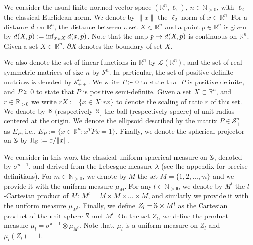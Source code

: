 We consider the usual finite normed vector space $(\mathbb{R}^n,\ell_2)$, $n \in \mathbb{N}_{> 0}$, with $\ell_2$ the classical Euclidean norm. We denote by $\lVert x \rVert$ the $\ell_2$-norm of $x \in \mathbb{R}^n$. For a distance $d$ on $\mathbb{R}^n$, the distance between a set $X \subset \mathbb{R}^n$ and a point $p \in \mathbb{R}^n$ is given by $d(X, p):=\inf_{x \in X}d(x,p)$. Note that the map $p \mapsto d(X,p)$ is continuous on $\mathbb{R}^n$. Given a set $X \subset \mathbb{R}^n$, $\partial X$ denotes the boundary of set $X$.
 
We also denote the set of linear functions in $\mathbb{R}^n$ by $\mathcal{L}(\mathbb{R}^n)$, and the set of real symmetric matrices of size $n$ by $\mathcal{S}^n$. In particular, the set of positive definite matrices is denoted by $\mathcal{S}^n_{++}$. We write $P \succ 0$ to state that $P$ is positive definite, and $P \succeq 0$ to state that $P$ is positive semi-definite. Given a set $X \subset \mathbb{R}^n$, and $r \in \mathbb{R}_{> 0}$ we write \mbox{$rX := \{x \in X : rx\}$} to denote the scaling of ratio $r$ of this set. We denote by $\mathbb{B}$ (respectively $\mathbb{S}$) the ball (respectively sphere) of unit radius centered at the origin.  We denote the ellipsoid described by the matrix $P \in \mathcal{S}^n_{++}$ as $E_P$, i.e., $E_P:= \{x \in \mathbb{R}^n: x^T P x = 1\}$. Finally, we denote the spherical projector on $\mathbb{S}$ by $\Pi_{\mathbb{S}} := x/\Vert x\Vert$. 


We consider in this work the classical uniform spherical measure on $\mathbb{S}$, denoted by $\sigma^{n-1}$, and derived from the Lebesgue measure $\lambda$ (see the appendix for precise definitions). For $m \in \mathbb{N}_{>0}$, we denote by $M$ the set $M=\{1,2, \dots,m \}$ and we provide it with the uniform measure $\mu_M$. For any $l \in \mathbb{N}_{>0}$, we denote by $M^l$ the $l$-Cartesian product of $M$: $M^l = M \times M \times \dots \times M$, and similarly we provide it with the uniform measure $\mu_{M^l}$. Finally, we define $Z_l = \mathbb{S} \times M^l$ as the Cartesian product of the unit sphere $\mathbb{S}$ and $M^l$. On the set $Z_l$, we define the product measure $\mu_l = \sigma^{n-1} \otimes \mu_{M^l}$. Note that, $\mu_l$ is a uniform measure on $Z_l$ and $\mu_l(Z_l)=1$.  

